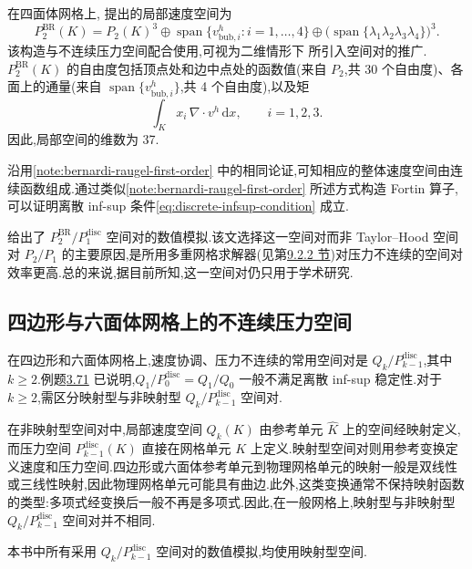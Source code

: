 \begin{note}\label{note:bernardi-raugel-second-order-3d}
在四面体网格上,\textcite{BernardiRaugel1985} 提出的局部速度空间为
\[
  P_2^{\mathrm{BR}}(K)
  =P_2(K)^3\oplus\operatorname{span}\{v_{\mathrm{bub},i}^h:
       i=1,\ldots,4\}
       \oplus\bigl(\operatorname{span}\{\lambda_1\lambda_2\lambda_3\lambda_4\}\bigr)^3.
\]
该构造与不连续压力空间配合使用,可视为二维情形下\textcite{CrouzeixRaviart1973} 所引入空间对的推广.$P_2^{\mathrm{BR}}(K)$ 的自由度包括顶点处和边中点处的函数值(来自 $P_2$,共 30 个自由度)、各面上的通量(来自 $\operatorname{span}\{v_{\mathrm{bub},i}^h\}$,共 4 个自由度),以及矩
\[
  \int_K x_i\,\nabla\cdot v^h\,\mathrm{d}x,
  \qquad i=1,2,3.
\]
因此,局部空间的维数为 37.

沿用\cref{note:bernardi-raugel-first-order} 中的相同论证,可知相应的整体速度空间由连续函数组成.通过类似\cref{note:bernardi-raugel-first-order} 所述方式构造 Fortin 算子,可以证明离散 inf-sup 条件\cref{eq:discrete-infsup-condition} 成立.

\textcite{JohnKindlSuciu2010} 给出了 $P_2^{\mathrm{BR}}/P_1^{\mathrm{disc}}$ 空间对的数值模拟.该文选择这一空间对而非 Taylor--Hood 空间对 $P_2/P_1$ 的主要原因,是所用多重网格求解器(见第\hyperref[subsec:multigrid-method]{9.2.2 节})对压力不连续的空间对效率更高.总的来说,据目前所知,这一空间对仍只用于学术研究.
\end{note}
\subsection{四边形与六面体网格上的不连续压力空间}\label{sec:quadrilateral-discontinuous-pressure}

\begin{note}\label{note:qk-pdisc-mapped-unmapped}
在四边形和六面体网格上,速度协调、压力不连续的常用空间对是 $Q_k/P_{k-1}^{\mathrm{disc}}$,其中 $k\ge2$.例题\hyperref[ex:q1-q0-instability]{3.71} 已说明,$Q_1/P_0^{\mathrm{disc}}=Q_1/Q_0$ 一般不满足离散 inf-sup 稳定性.对于 $k\ge2$,需区分映射型与非映射型 $Q_k/P_{k-1}^{\mathrm{disc}}$ 空间对.

在非映射型空间对中,局部速度空间 $Q_k(K)$ 由参考单元 $\widehat K$ 上的空间经映射定义,而压力空间 $P_{k-1}^{\mathrm{disc}}(K)$ 直接在网格单元 $K$ 上定义.映射型空间对则用参考变换定义速度和压力空间.四边形或六面体参考单元到物理网格单元的映射一般是双线性或三线性映射,因此物理网格单元可能具有曲边.此外,这类变换通常不保持映射函数的类型:多项式经变换后一般不再是多项式.因此,在一般网格上,映射型与非映射型 $Q_k/P_{k-1}^{\mathrm{disc}}$ 空间对并不相同.

本书中所有采用 $Q_k/P_{k-1}^{\mathrm{disc}}$ 空间对的数值模拟,均使用映射型空间.
\end{note}

